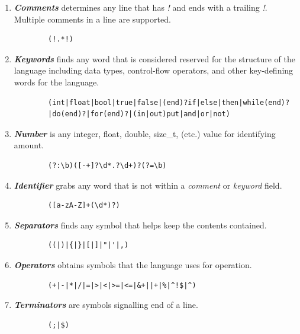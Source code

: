 \documentclass{article}
\begin{document}
        \begin{enumerate}

            \item \emph{\textbf{Comments}} determines any line that has \emph{!} and ends with a trailing \emph{!}. Multiple comments in a line are supported.
            \begin{Verbatim}
        (!.*!)
            \end{Verbatim}
            
            \item \emph{\textbf{Keywords}} finds any word that is considered reserved for the structure of the language including data types, control-flow operators, and other key-defining words for the language.  
            \begin{Verbatim}
        (int|float|bool|true|false|(end)?if|else|then|while(end)?
        |do(end)?|for(end)?|(in|out)put|and|or|not)
            \end{Verbatim}
            
            \item \emph{\textbf{Number}} is any integer, float, double, size\_t, (etc.) value for identifying amount. 
            \begin{Verbatim}
        (?:\b)([-+]?\d*.?\d+)?(?=\b)
            \end{Verbatim}

            \item \emph{\textbf{Identifier}} grabs any word that is not within a \emph{comment} or \emph{keyword} field.
            \begin{Verbatim}
        ([a-zA-Z]+(\d*)?) 
            \end{Verbatim}
            
            \item \emph{\textbf{Separators}} finds any symbol that helps keep the contents contained.
            \begin{Verbatim}
        ((|)|{|}|[|]|"|'|,)
            \end{Verbatim}
            
            \item \emph{\textbf{Operators}} obtains symbols that the language uses for operation.
            \begin{Verbatim}
        (+|-|*|/|=|>|<|>=|<=|&+||+|%|^!$|^)
            \end{Verbatim}
           
            \item \emph{\textbf{Terminators}} are symbols signalling end of a line.
            \begin{Verbatim}
        (;|$) 
            \end{Verbatim}

        \end{enumerate}
\end{document}
